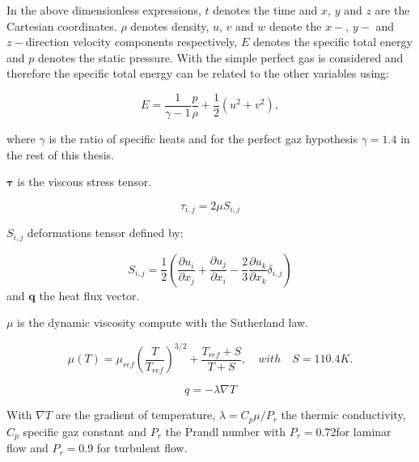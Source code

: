 In the above dimensionless expressions, $t$ denotes the time and $x$, $y$ and $z$ are the Cartesian coordinates.
$\rho$ denotes density, $u$, $v$ and $w$ denote the $x-$, $y-$ and $z-$direction velocity components respectively, $E$ denotes the specific total energy and $p$ denotes the static pressure.
With the simple perfect gas is considered and therefore the specific total energy can be related to the other variables using:

\begin{equation}
    E = \dfrac{1}{\gamma - 1} \dfrac{p}{\rho} + \dfrac{1}{2}\left( u^2 + v^2 \right),
    \label{eq:perfect_gas_energy}
\end{equation}

where $\gamma$ is the ratio of specific heats and for the perfect gaz hypothesis $\gamma = 1.4$ in the rest of this thesis.

$\mathbf{\tau}$ is the viscous stress tensor.

\begin{equation}
    \tau_{i,j} = 2\mu S_{i,j}
    \label{eq:stres_tensor}
\end{equation}

$S_{i,j}$ deformations tensor defined by:

\begin{equation}
    S_{i,j} = \frac{1}{2}\left(\frac{\partial u_i}{\partial x_j} + \frac{\partial u_j}{\partial x_i} - \frac{2}{3} \frac{\partial u_k}{\partial x_k}\delta_{i,j}\right)
    \label{eq:stres_tensor_deformation}
\end{equation}
and $\mathbf{q}$ the heat flux vector.

$\mu$ is the dynamic viscosity compute with the Sutherland law.

\begin{equation}
    \mu(T) = \mu_{ref}\left(\frac{T}{T_{ref}}\right)^{3/2} + \frac{T_{ref}+S}{T+S}, \quad with \quad S = 110.4 K.
    \label{eq:mu_sutherland}
\end{equation}

\begin{equation}
    q = -\lambda\nabla T
    \label{eq:stres_tensor}
\end{equation}

With $\nabla T$ are the gradient of temperature, $\lambda = C_p\mu/P_r$ the thermic conductivity, $C_p$ specific gaz constant and $P_r$ the Prandl number with $P_r = 0.72 $for laminar flow and $P_r = 0.9$ for turbulent flow.
